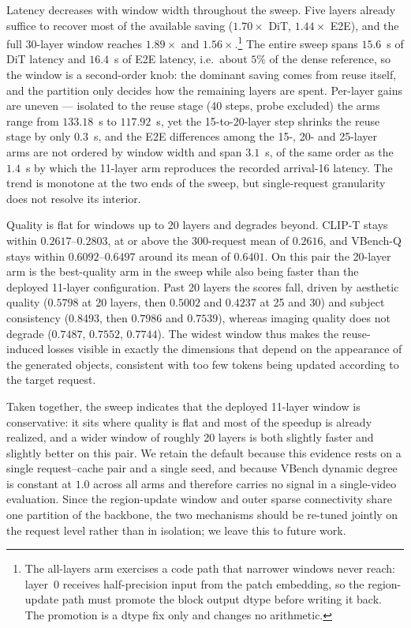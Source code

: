 Latency decreases with window width throughout the sweep. Five layers already suffice to recover
most of the available saving ($1.70\times$ DiT, $1.44\times$ E2E), and the full 30-layer window
reaches $1.89\times$ and $1.56\times$.\footnote{The all-layers arm exercises a code path that
narrower windows never reach: layer~0 receives half-precision input from the patch embedding, so the
region-update path must promote the block output dtype before writing it back. The promotion is a
dtype fix only and changes no arithmetic.} The entire sweep spans $15.6$~s of DiT latency and
$16.4$~s of E2E latency, i.e.\ about $5\%$ of the dense reference, so the window is a second-order
knob: the dominant saving comes from reuse itself, and the partition only decides how the remaining
layers are spent. Per-layer gains are uneven --- isolated to the reuse stage (40 steps, probe
excluded) the arms range from $133.18$~s to $117.92$~s, yet the 15-to-20-layer step shrinks the reuse
stage by only $0.3$~s, and the E2E differences among the 15-, 20- and 25-layer arms are not ordered
by window width and span $3.1$~s, of the same order as the $1.4$~s by which the 11-layer arm
reproduces the recorded arrival-16 latency. The trend is monotone at the two ends of the sweep, but
single-request granularity does not resolve its interior.

Quality is flat for windows up to 20 layers and degrades beyond. CLIP-T stays within
$0.2617$--$0.2803$, at or above the 300-request mean of $0.2616$, and VBench-Q stays within
$0.6092$--$0.6497$ around its mean of $0.6401$. On this pair the 20-layer arm is the best-quality arm
in the sweep while also being faster than the deployed 11-layer configuration. Past 20 layers the
scores fall, driven by aesthetic quality ($0.5798$ at 20 layers, then $0.5002$ and $0.4237$ at 25
and 30) and subject consistency ($0.8493$, then $0.7986$ and $0.7539$), whereas imaging quality does
not degrade ($0.7487$, $0.7552$, $0.7744$). The widest window thus makes the reuse-induced losses
visible in exactly the dimensions that depend on the appearance of the generated objects, consistent
with too few tokens being updated according to the target request.

Taken together, the sweep indicates that the deployed 11-layer window is conservative: it sits where
quality is flat and most of the speedup is already realized, and a wider window of roughly 20 layers
is both slightly faster and slightly better on this pair. We retain the default because this evidence
rests on a single request--cache pair and a single seed, and because VBench dynamic degree is
constant at $1.0$ across all arms and therefore carries no signal in a single-video evaluation. Since
the region-update window and outer sparse connectivity share one partition of the backbone, the two
mechanisms should be re-tuned jointly on the request level rather than in isolation; we leave this to
future work.
